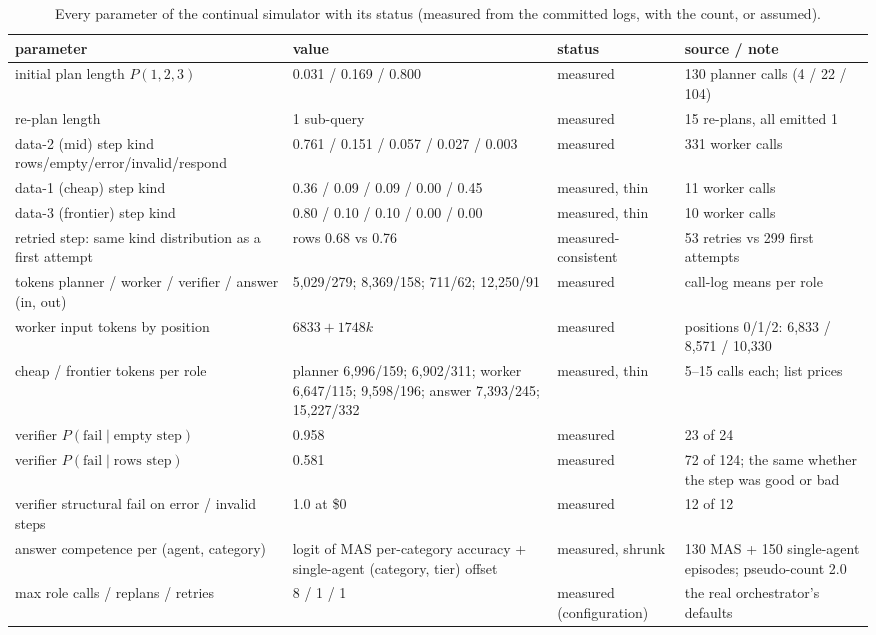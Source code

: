 \documentclass[10pt]{article}
\begin{document}
\begin{table}[H]
\centering\footnotesize
\caption{Every parameter of the continual simulator with its status (measured from the committed logs, with the count, or assumed).}
\begin{tabular}{p{4.2cm}p{3.6cm}p{1.9cm}p{4.9cm}}
\toprule
parameter & value & status & source / note \\
\midrule
initial plan length $P(1,2,3)$ & 0.031 / 0.169 / 0.800 & measured & 130 planner calls (4 / 22 / 104) \\
re-plan length & 1 sub-query & measured & 15 re-plans, all emitted 1 \\
data-2 (mid) step kind rows/empty/error/invalid/respond & 0.761 / 0.151 / 0.057 / 0.027 / 0.003 & measured & 331 worker calls \\
data-1 (cheap) step kind & 0.36 / 0.09 / 0.09 / 0.00 / 0.45 & measured, thin & 11 worker calls \\
data-3 (frontier) step kind & 0.80 / 0.10 / 0.10 / 0.00 / 0.00 & measured, thin & 10 worker calls \\
retried step: same kind distribution as a first attempt & rows 0.68 vs 0.76 & measured-consistent & 53 retries vs 299 first attempts \\
tokens planner / worker / verifier / answer (in, out) & 5,029/279; 8,369/158; 711/62; 12,250/91 & measured & call-log means per role \\
worker input tokens by position & $6833+1748k$ & measured & positions 0/1/2: 6,833 / 8,571 / 10,330 \\
cheap / frontier tokens per role & planner 6,996/159; 6,902/311; worker 6,647/115; 9,598/196; answer 7,393/245; 15,227/332 & measured, thin & 5--15 calls each; list prices \\
verifier $P(\text{fail}\mid\text{empty step})$ & 0.958 & measured & 23 of 24 \\
verifier $P(\text{fail}\mid\text{rows step})$ & 0.581 & measured & 72 of 124; the same whether the step was good or bad \\
verifier structural fail on error / invalid steps & 1.0 at \$0 & measured & 12 of 12 \\
answer competence per (agent, category) & logit of MAS per-category accuracy + single-agent (category, tier) offset & measured, shrunk & 130 MAS + 150 single-agent episodes; pseudo-count 2.0 \\
max role calls / replans / retries & 8 / 1 / 1 & measured (configuration) & the real orchestrator's defaults \\

\end{tabular}
\end{table}
\end{document}
